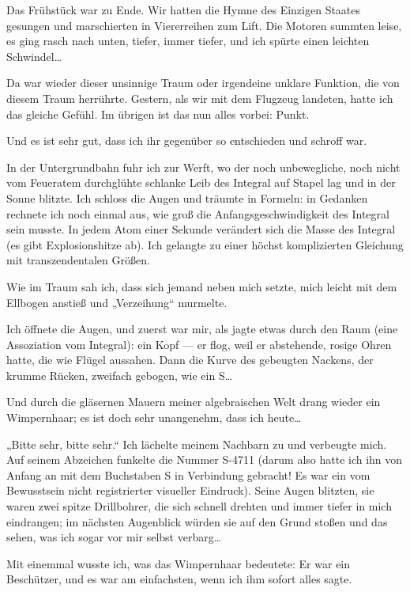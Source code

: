 Das Frühstück war
zu Ende. Wir hatten die Hymne des Einzigen Staates gesungen und
marschierten in Viererreihen zum Lift. Die Motoren summten leise,
es ging rasch nach unten, tiefer, immer tiefer, und ich spürte
einen leichten Schwindel\ldots{}

Da war wieder dieser unsinnige Traum oder irgendeine unklare
Funktion, die von diesem Traum herrührte. Gestern, als wir mit dem
Flugzeug landeten, hatte ich das gleiche Gefühl. Im übrigen ist das
nun alles vorbei: Punkt.

Und es ist sehr gut, dass ich ihr gegenüber so entschieden und
schroff war.

In der Untergrundbahn fuhr ich zur Werft, wo der noch unbewegliche,
noch nicht vom Feueratem durchglühte schlanke Leib des Integral auf
Stapel lag und in der Sonne blitzte. Ich schloss die Augen und
träumte in Formeln: in Gedanken rechnete ich noch einmal aus, wie
groß die Anfangsgeschwindigkeit des Integral sein musste. In jedem
Atom einer Sekunde verändert sich die Masse des Integral (es gibt
Explosionshitze ab). Ich gelangte zu einer höchst komplizierten
Gleichung mit transzendentalen Größen.

Wie im Traum sah ich, dass sich jemand neben mich setzte, mich
leicht mit dem Ellbogen anstieß und „Verzeihung“ murmelte.

Ich öffnete die Augen, und zuerst war mir, als jagte etwas durch
den Raum (eine Assoziation vom Integral): ein Kopf — er flog, weil
er abstehende, rosige Ohren hatte, die wie Flügel aussahen. Dann
die Kurve des gebeugten Nackens, der krumme Rücken, zweifach
gebogen, wie ein S\ldots{}

Und durch die gläsernen Mauern meiner algebraischen Welt drang
wieder ein Wimpernhaar; es ist doch sehr unangenehm, dass ich
heute\ldots{}

„Bitte sehr, bitte sehr.“ Ich lächelte meinem Nachbarn
zu und verbeugte mich. Auf seinem Abzeichen funkelte die Nummer
S-4711 (darum also hatte ich ihn von Anfang an mit dem Buchstaben S
in Verbindung gebracht! Es war ein vom Bewusstsein nicht
registrierter visueller Eindruck). Seine Augen blitzten, sie waren
zwei spitze Drillbohrer, die sich schnell drehten und immer tiefer
in mich eindrangen; im nächsten Augenblick würden sie auf den Grund
stoßen und das sehen, was ich sogar vor mir selbst verbarg\ldots{}

Mit einemmal wusste ich, was das Wimpernhaar bedeutete: Er war ein
Beschützer, und es war am einfachsten, wenn ich ihm sofort alles
sagte.

